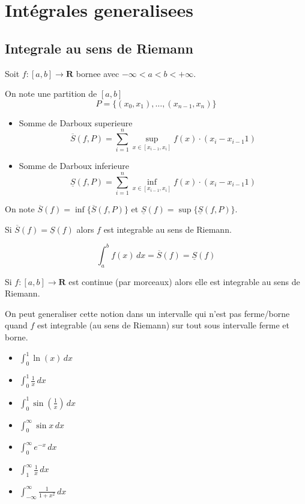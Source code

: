 \chapter{Intégrales generalisees}
\section{Integrale au sens de Riemann}
Soit $f:[a,b]\to \mathbf{R}$ bornee avec $-\infty<a<b<+\infty$.
\begin{definition}[Partition]
 On note une partition de $[a,b]$
$$
P=\{ (x_{0},x_{1}),\dots,(x_{n-1},x_{n}) \}
$$
\end{definition}
\begin{definition}
\begin{itemize}
\item Somme de Darboux superieure
$$
\overline{S}(f,P)=\sum_{i=1}^{n} \sup_{x \in [x_{i-1},x_{i}]}f(x)\cdot(x_{i}-x_{i-1}1)
$$
\item Somme de Darboux inferieure
$$
\underline{S}(f,P)=\sum_{i=1}^{n} \inf_{x \in [x_{i-1},x_{i}]}f(x)\cdot(x_{i}-x_{i-1}1)
$$
\end{itemize}
On note $\overline{S}(f)=\inf\{ \overline{S}(f,P)\}$ et $\underline{S}(f)=\sup \{ \underline{S}(f,P) \}$.
\end{definition}

Si $\overline{S}(f)=\underline{S}(f)$ alors $f$ est integrable au sens de Riemann.
\begin{notation}
$$
\int_{a}^{b} f(x) \, dx=\overline{S}(f)=\underline{S}(f) 
$$
\end{notation}
\begin{proposition}
Si $f:[a,b]\to \mathbf{R}$ est continue (par morceaux) alors elle est integrable au sens de Riemann. 
\end{proposition}

On peut generaliser cette notion dans un intervalle qui n'est pas ferme/borne quand $f$ est integrable (au sens de Riemann) sur tout sous intervalle ferme et borne.
\begin{example}
\begin{itemize}
\item $\int_{0}^{1} \ln(x) \, dx$
\item $\int_{0}^{1} \frac{1}{x} \, dx$
\item $\int_{0}^{1} \sin\left( \frac{1}{x} \right) \, dx$
\item $\int_{0}^{\infty}\sin x  \, dx$
\item $\int_{0}^{\infty}e^{ -x }  \, dx$
\item $\int_{1}^{\infty} \frac{1}{x} \, dx$
\item $\int_{-\infty}^{\infty} \frac{1}{1+x^{2}} \, dx$
\end{itemize}
\end{example}
